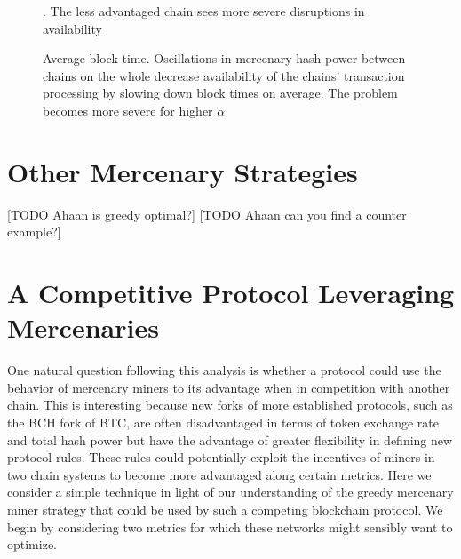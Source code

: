 \documentclass[10pt, preprint]{aastex}
\begin{document}
\begin{figure}
{		\label{fig:theo}
		}
	\qquad
	\qquad
	\caption{Average block time.  Oscillations in mercenary hash power between chains on the whole decrease availability of the chains' transaction processing by slowing down block times on average.  The problem becomes more severe for higher $\alpha$}.  The less advantaged chain sees more severe disruptions in availability
\end{figure}


\section{Other Mercenary Strategies}
[TODO Ahaan is greedy optimal?]
[TODO Ahaan can you find a counter example?]


\section{A Competitive Protocol Leveraging Mercenaries}
One natural question following this analysis is whether a protocol could use the behavior of mercenary miners to its advantage when in competition with another chain.  This is interesting because new forks of more established protocols, such as the BCH fork of BTC, are often disadvantaged in terms of token exchange rate and total hash power but have the advantage of greater flexibility in defining new protocol rules.  These rules could potentially exploit the incentives of miners in two chain systems to become more advantaged along certain metrics.  Here we consider a simple technique in light of our understanding of the greedy mercenary miner strategy that could be used by such a competing blockchain protocol.  We begin by considering two metrics for which these networks might sensibly want to optimize.
\end{document}
